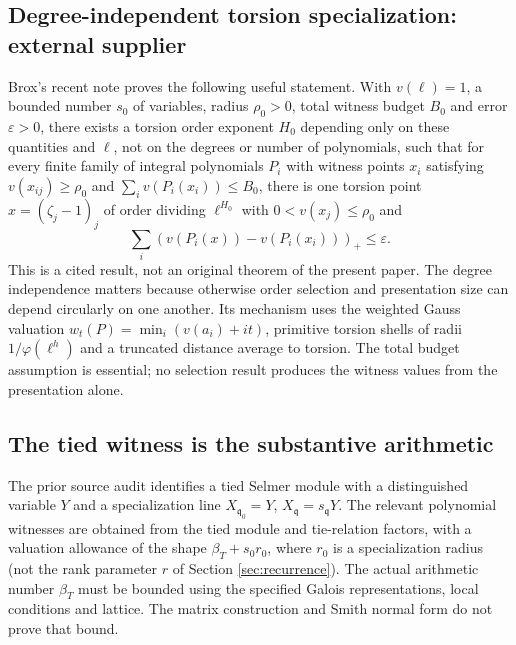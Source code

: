 \documentclass[11pt,a4paper]{article}
\begin{document}
\subsection{Degree-independent torsion specialization: external supplier}
Brox's recent note \cite{broxtorsion} proves the following useful statement. With $v(\ell)=1$, a bounded number $s_0$ of variables, radius $\rho_0>0$, total witness budget $B_0$ and error $\varepsilon>0$, there exists a torsion order exponent $H_0$ depending only on these quantities and $\ell$, not on the degrees or number of polynomials, such that for every finite family of integral polynomials $P_i$ with witness points $x_i$ satisfying $v(x_{ij})\geq\rho_0$ and $\sum_i v(P_i(x_i))\leq B_0$, there is one torsion point $x=(\zeta_j-1)_j$ of order dividing $\ell^{H_0}$ with $0<v(x_j)\leq\rho_0$ and
\begin{equation}\label{eq:brox}
\sum_i(v(P_i(x))-v(P_i(x_i)))_+\leq\varepsilon.
\end{equation}
This is a cited result, not an original theorem of the present paper. The degree independence matters because otherwise order selection and presentation size can depend circularly on one another. Its mechanism uses the weighted Gauss valuation $w_t(P)=\min_i(v(a_i)+it)$, primitive torsion shells of radii $1/\varphi(\ell^h)$ and a truncated distance average to torsion. The total budget assumption is essential; no selection result produces the witness values from the presentation alone.

\subsection{The tied witness is the substantive arithmetic}
The prior source audit identifies a tied Selmer module with a distinguished variable $Y$ and a specialization line $X_{\mathfrak q_0}=Y$, $X_{\mathfrak q}=s_{\mathfrak q}Y$. The relevant polynomial witnesses are obtained from the tied module and tie-relation factors, with a valuation allowance of the shape $\beta_T+s_0r_0$, where $r_0$ is a specialization radius (not the rank parameter $r$ of Section \ref{sec:recurrence}). The actual arithmetic number $\beta_T$ must be bounded using the specified Galois representations, local conditions and lattice. The matrix construction and Smith normal form do not prove that bound.
\end{document}
